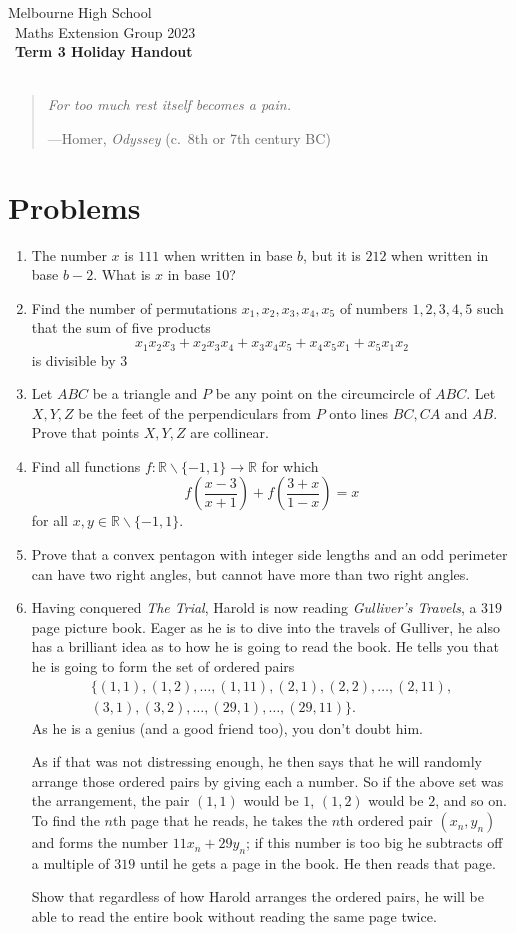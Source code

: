 \documentclass[a4paper]{article}
\title{{\thepdftitle}}
\author{Nathan Wong\and Tom Yan}
\date{2023}
\newcommand{\thedisplaytitle}{Term 3 Holiday Handout}
\newcommand{\marginnote}[1]{\marginpar{\footnotesize{#1}}}
\let\mathbbalt\mathbb
\let\mathbb\mathbbalt
\newcommand{\myquote}[2]{%
  \begin{quote}
    \emph{#1}
    \begin{flushright}---{#2}
    \end{flushright}
  \end{quote}}
\begin{document}
\noindent Melbourne High School\\\
\noindent Maths Extension Group 2023\\\
\noindent \textbf{\thedisplaytitle}\\\
\myquote{For too much rest itself becomes a pain.}{Homer, \emph{Odyssey} (c.~8th or 7th century BC)}
\section*{Problems}
\begin{enumerate}
	\item The \marginnote{AIMO 2017/1} number $x$ is $111$ when written in base $b$, but it is $212$ when written in base $b-2$. What is $x$ in base $10$? 
	\item Find \marginnote{AIME II 2021/3} the number of permutations $x_1, x_2, x_3, x_4, x_5$ of numbers $1, 2, 3, 4, 5$ such that the sum of five products\[x_1x_2x_3 + x_2x_3x_4 + x_3x_4x_5 + x_4x_5x_1 + x_5x_1x_2\]is divisible by $3$
	\item Let \marginnote{Simson Line} $ABC$ be a triangle and $P$ be any point on the circumcircle of $ABC$. Let $X, Y, Z$ be the feet of the perpendiculars from $P$ onto lines $BC, CA$ and $AB$. Prove that points $X, Y, Z$ are collinear.
	\item Find all functions $f: \mathbb{R} \backslash \{-1, 1\} \rightarrow \mathbb{R} $ for which $$f\left(\frac{x-3}{x+1}\right)+f\left(\frac{3+x}{1-x}\right)=x$$ for all $x,y \in \mathbb{R} \backslash \{-1, 1\}$. 
	\item Prove \marginnote{AMO 2022/1} that a convex pentagon with integer side lengths and an odd perimeter can have two right angles, but cannot have more than two right angles.  
	\item Having conquered \emph{The Trial}, Harold is now reading
		\emph{Gulliver's Travels}, a \(319\) page picture book.
		Eager as he is to dive into
		the travels of Gulliver, he also has a brilliant idea
		as to how he is going to read the book. 
		He tells you that he is going to form the set of ordered
		pairs 
		\[
			\begin{split}
				\{(1,1),(1,2),\ldots,(1,11),(2,1),(2,2),\ldots,(2,11),\\(3,1),(3,2),\ldots,(29,1),\ldots,(29,11)\}.
			\end{split}\]
		As he is a genius (and a good friend too), you don't doubt him.

		As if that was not distressing enough, he then says that he
		will randomly arrange those ordered pairs by giving each
		a number. So if the above set was the arrangement, the
		pair \((1,1)\) would be \(1\), \((1,2)\) would be \(2\),
		and so on. To find the \(n\)th page that he reads, he
		takes the \(n\)th ordered pair \((x_n,y_n)\) and forms
		the number \(11x_n+29y_n\); if this number is too big
		he subtracts off a multiple of \(319\) until he gets
		a page in the book. He then reads that page.

		Show that regardless of how Harold arranges the ordered
		pairs, he will be able to read the entire book without
		reading the same page twice.
		
\end{enumerate}
\end{document}
